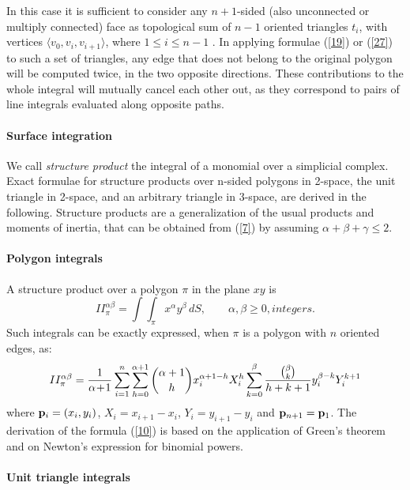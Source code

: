 \documentclass[11pt,oneside]{article}	%
\def\sint{\int\!\!\int}
\def\isum{\sum_{i=1}^n}
\begin{document}
In this case it is sufficient to consider any $n+1$-sided (also
unconnected or multiply connected) face as topological sum of $n-1$
oriented triangles $t_i$, with vertices $\langle v_0, v_i,
v_{i+1}\rangle$, where $1\le i\le n-1$ .  In applying formulae
(\ref{19}) or (\ref{27}) to such a set of triangles, any edge that
does not belong to the original polygon will be computed twice, in the
two opposite directions.  These contributions to the whole integral
will mutually cancel each other out, as they correspond to pairs of
line integrals evaluated along opposite paths.


\paragraph{Surface integration}

We call \emph{structure product}  the integral of a monomial over a 
simplicial complex.  Exact formulae for
 structure products over  n-sided polygons in 2-space,
the unit triangle in 2-space, and an arbitrary triangle in 3-space, 
are derived in the following.
Structure products  are a generalization of the usual products
and moments of inertia, that can be obtained from (\ref{7}) by assuming 
$\alpha + \beta + \gamma\leq 2$.  


\paragraph{Polygon integrals}

A structure product over a polygon $\pi$ in the plane $xy$ is
\begin{equation} \label{9} 
II_\pi^{\alpha\beta} = \sint_{\pi} x^\alpha y^\beta \,dS,
\qquad \alpha,\beta\geq 0, integers.
\end{equation}
Such integrals can be exactly expressed, when
$\pi$ is a  polygon with $n$ oriented edges, as:
\begin{equation} \label{10} 
II_\pi^{\alpha\beta} = 
{1\over{\alpha \!+\!1}}
\isum\sum_{h=0}^{\alpha+1}
{\alpha+1\choose  h}
x_i^{\alpha+1-h} X_i^h
\sum_{k=0}^{\beta}
{{{\beta\choose  k}}\over{h+k+1}}
y_i^{\beta-k} Y_i^{k+1}
\end{equation}
where ${\bf p}_i=(x_i, y_i)$, $X_i=x_{i+1}-x_{i}$, $Y_i=y_{i+1}-y_{i}$
and ${\bf p}_{n+1} = {\bf p}_1$.  The derivation of the formula
(\ref{10}) is based on the application of Green's theorem and on
Newton's expression for binomial powers.


\paragraph{Unit triangle integrals}
\end{document}
